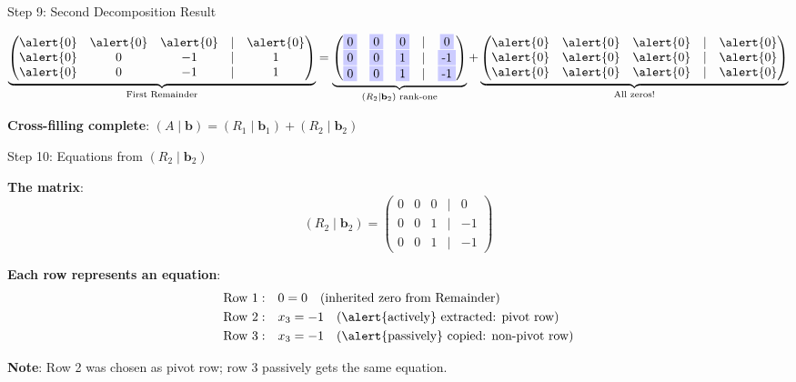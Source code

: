 \documentclass[10pt]{beamer}
\theoremstyle{definition}
\newcommand{\x}[1]{\alert{\textbf{#1}}}
\begin{document}
\begin{frame}[fragile]{Step 9: Second Decomposition Result}

$$\underbrace{\begin{pmatrix}
\alert{0} & \alert{0} & \alert{0} & | & \alert{0} \\
\alert{0} & 0 & -1 & | & 1 \\
\alert{0} & 0 & -1 & | & 1
\end{pmatrix}}_{\text{First Remainder}} = \underbrace{\begin{pmatrix}
\colorbox{blue!20}{0} & \colorbox{blue!20}{0} & \colorbox{blue!20}{0} & | & \colorbox{blue!20}{0} \\
\colorbox{blue!20}{0} & \colorbox{blue!20}{0} & \colorbox{blue!20}{1} & | & \colorbox{blue!20}{-1} \\
\colorbox{blue!20}{0} & \colorbox{blue!20}{0} & \colorbox{blue!20}{1} & | & \colorbox{blue!20}{-1}
\end{pmatrix}}_{(R_2 \mid \mathbf{b}_2) \text{ rank-one}} + \underbrace{\begin{pmatrix}
\alert{0} & \alert{0} & \alert{0} & | & \alert{0} \\
\alert{0} & \alert{0} & \alert{0} & | & \alert{0} \\
\alert{0} & \alert{0} & \alert{0} & | & \alert{0}
\end{pmatrix}}_{\text{All zeros!}}$$

\vspace{1em}

\x{Cross-filling complete}: $(A \mid \mathbf{b}) = (R_1 \mid \mathbf{b}_1) + (R_2 \mid \mathbf{b}_2)$

\end{frame}

\begin{frame}{Step 10: Equations from $(R_2 \mid \mathbf{b}_2)$}

\x{The matrix}:
$$(R_2 \mid \mathbf{b}_2) = \begin{pmatrix}
0 & 0 & 0 & | & 0 \\
0 & 0 & 1 & | & -1 \\
0 & 0 & 1 & | & -1
\end{pmatrix}$$

\vspace{0.5em}

\x{Each row represents an equation}:
\begin{align*}
\text{Row 1}: &\quad 0 = 0 \quad \text{(inherited zero from Remainder)} \\
\text{Row 2}: &\quad x_3 = -1 \quad \text{(\alert{actively} extracted: pivot row)} \\
\text{Row 3}: &\quad x_3 = -1 \quad \text{(\alert{passively} copied: non-pivot row)}
\end{align*}

\x{Note}: Row 2 was chosen as pivot row; row 3 passively gets the same equation.

\end{frame}
\end{document}
